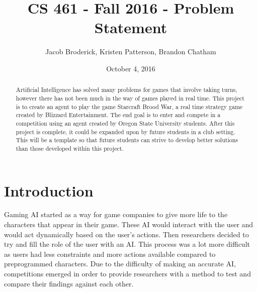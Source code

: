 \documentclass[10pt,letterpaper,onecolumn,draftclsnofoot]{IEEEtran}
\begin{document}
\begin{titlepage}
  \title{CS 461 - Fall 2016 - Problem Statement}
  \author{Jacob Broderick, Kristen Patterson, Brandon Chatham}
  \date{October 4, 2016}
  \maketitle
  \vspace{4cm}
  \begin{abstract}
  	\noindent 
  	  	\noindent 
  	Artificial Intelligence has solved many problems for games that involve taking turns, however there has not been much in the way of games played in real time. This project is to create an agent to play the game Starcraft Brood War, a real time strategy game created by Blizzard Entertainment. The end goal is to enter and compete in a competition using an agent created by Oregon State University students. After this project is complete, it could be expanded upon by future students in a club setting. This will be a template so that future students can strive to develop better solutions than those developed within this project.
  \end{abstract}
\end{titlepage}
\section{Introduction}
Gaming AI started as a way for game companies to give more life to the characters that appear in their game. These AI would interact with the user and would act dynamically based on the user's actions. Then researchers decided to try and fill the role of the user with an AI. This process was a lot more difficult as users had less constraints and more actions available compared to preprogrammed characters. Due to the difficulty of making an accurate AI, competitions emerged in order to provide researchers with a method to test and compare their findings against each other.
\end{document}

